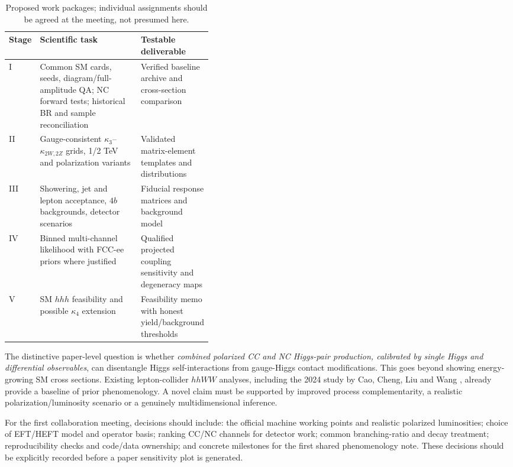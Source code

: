 \documentclass[12pt,a4paper]{article}
\begin{document}
\begin{table}[H]
\centering\small\caption{Proposed work packages; individual assignments should be agreed at the meeting, not presumed here.}
\begin{tabularx}{\linewidth}{@{}p{0.13\linewidth}X p{0.27\linewidth}@{}}\toprule
Stage & Scientific task & Testable deliverable\\\midrule
I & Common SM cards, seeds, diagram/full-amplitude QA; NC forward tests; historical BR and sample reconciliation & Verified baseline archive and cross-section comparison\\
II & Gauge-consistent $\kappa_3$--$\kappa_{2W,2Z}$ grids, 1/2 TeV and polarization variants & Validated matrix-element templates and distributions\\
III & Showering, jet and lepton acceptance, $4b$ backgrounds, detector scenarios & Fiducial response matrices and background model\\
IV & Binned multi-channel likelihood with FCC-ee priors where justified & Qualified projected coupling sensitivity and degeneracy maps\\
V & SM $hhh$ feasibility and possible $\kappa_4$ extension & Feasibility memo with honest yield/background thresholds\\\bottomrule
\end{tabularx}
\end{table}



The distinctive paper-level question is whether \emph{combined polarized CC and NC Higgs-pair production, calibrated by single Higgs and differential observables}, can disentangle Higgs self-interactions from gauge-Higgs contact modifications. This goes beyond showing energy-growing SM cross sections. Existing lepton-collider $hhWW$ analyses, including the 2024 study by Cao, Cheng, Liu and Wang \cite{cao}, already provide a baseline of prior phenomenology. A novel claim must be supported by improved process complementarity, a realistic polarization/luminosity scenario or a genuinely multidimensional inference.

For the first collaboration meeting, decisions should include: the official machine working points and realistic polarized luminosities; choice of EFT/HEFT model and operator basis; ranking CC/NC channels for detector work; common branching-ratio and decay treatment; reproducibility checks and code/data ownership; and concrete milestones for the first shared phenomenology note. These decisions should be explicitly recorded before a paper sensitivity plot is generated.
\end{document}
